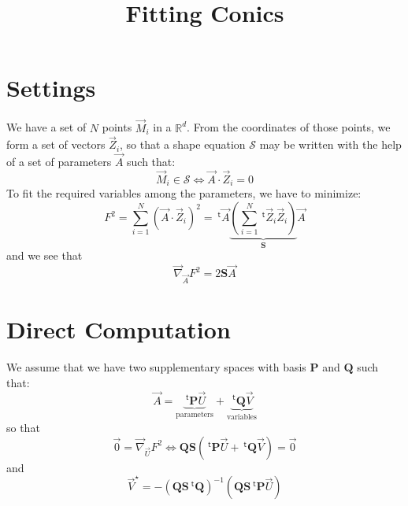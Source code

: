 \documentclass[aps]{revtex4}
\newcommand{\mymat}[1]{\boldsymbol{#1}}
\newcommand{\mytrn}[1]{~^{\mathsf{t}}\!{#1}}
\newcommand{\mygrad}{\vec{\nabla}}
\begin{document}
\title{Fitting Conics}
\maketitle
\section{Settings}

We have a set of $N$ points $\vec{M}_i$ in a $\mathbb{R}^d$.
From the coordinates of those points, we form a set of vectors $\vec{Z}_i$,
so that a shape equation $\mathcal{S}$ may be written with the help of a set of parameters $\vec{A}$
such that:
\begin{equation}
\vec{M}_i\in\mathcal{S} \Leftrightarrow \vec{A}\cdot\vec{Z}_i = 0
\end{equation}
To fit the required variables among the parameters, we have to minimize:
\begin{equation}
 F^2 = \sum_{i=1}^N \left(\vec{A}\cdot\vec{Z}_i\right)^2
  = \mytrn{\vec{A}} \underbrace{\left(\sum_{i=1}^N\mytrn{\vec{Z}_i}\vec{Z}_i\right)}_{\mymat{S}} \vec{A}
\end{equation}
and we see that
\begin{equation}
	\mygrad_{\vec{A}} F^2 = 2 \mymat{S} \vec{A}
\end{equation}

\section{Direct Computation}
We assume that we have two supplementary spaces with basis $\mymat{P}$ and $\mymat{Q}$ such that:
\begin{equation}
	\vec{A} = \underbrace{\mytrn{\mymat{P}} \vec{U}}_{\text{parameters}} + \underbrace{\mytrn{\mymat{Q}} \vec{V}}_{\text{variables}}
\end{equation}
so that
\begin{equation}
 \vec{0} = \mygrad_{\vec{U}} F^2 \Leftrightarrow \mymat{Q}\mymat{S}\left(\mytrn{\mymat{P}} \vec{U} + \mytrn{\mymat{Q}} \vec{V}\right) = \vec{0}
\end{equation}
and
\begin{equation}
	\vec{V}^\star = -\left(\mymat{Q}\mymat{S}  \mytrn{\mymat{Q}}\right)^{-1} \left(\mymat{Q}\mymat{S} \mytrn{\mymat{P}} \vec{U}\right)
\end{equation}
\end{document}
